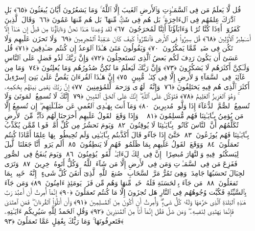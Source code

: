  قُل لَّا يَعلَمُ مَن فِى ٱلسَّمَـٰوَٟتِ وَٱلأَرضِ ٱلغَيبَ إِلَّا ٱللَّهُ ۚ وَمَا يَشعُرُونَ أَيَّانَ يُبعَثُونَ ﴿٦٥﴾
 بَلِ ٱدَّٰرَكَ عِلمُهُم فِى ٱلءَاخِرَةِ ۚ بَل هُم فِى شَكٍّۢ مِّنهَا ۖ بَل هُم مِّنهَا عَمُونَ ﴿٦٦﴾
 وَقَالَ ٱلَّذِينَ كَفَرُوٓا۟ أَءِذَا كُنَّا تُرَٰبًۭا وَءَابَآؤُنَآ أَئِنَّا لَمُخرَجُونَ ﴿٦٧﴾
 لَقَد وُعِدنَا هَـٰذَا نَحنُ وَءَابَآؤُنَا مِن قَبلُ إِن هَـٰذَآ إِلَّآ أَسَـٰطِيرُ ٱلأَوَّلِينَ ﴿٦٨﴾
 قُل سِيرُوا۟ فِى ٱلأَرضِ فَٱنظُرُوا۟ كَيفَ كَانَ عَـٰقِبَةُ ٱلمُجرِمِينَ ﴿٦٩﴾
 وَلَا تَحزَن عَلَيهِم وَلَا تَكُن فِى ضَيقٍۢ مِّمَّا يَمكُرُونَ ﴿٧٠﴾
 وَيَقُولُونَ مَتَىٰ هَـٰذَا ٱلوَعدُ إِن كُنتُم صَـٰدِقِينَ ﴿٧١﴾
 قُل عَسَىٰٓ أَن يَكُونَ رَدِفَ لَكُم بَعضُ ٱلَّذِى تَستَعجِلُونَ ﴿٧٢﴾
 وَإِنَّ رَبَّكَ لَذُو فَضلٍ عَلَى ٱلنَّاسِ وَلَـٰكِنَّ أَكثَرَهُم لَا يَشكُرُونَ ﴿٧٣﴾
 وَإِنَّ رَبَّكَ لَيَعلَمُ مَا تُكِنُّ صُدُورُهُم وَمَا يُعلِنُونَ ﴿٧٤﴾
 وَمَا مِن غَآئِبَةٍۢ فِى ٱلسَّمَآءِ وَٱلأَرضِ إِلَّا فِى كِتَـٰبٍۢ مُّبِينٍ ﴿٧٥﴾
 إِنَّ هَـٰذَا ٱلقُرءَانَ يَقُصُّ عَلَىٰ بَنِىٓ إِسرَٰٓءِيلَ أَكثَرَ ٱلَّذِى هُم فِيهِ يَختَلِفُونَ ﴿٧٦﴾
 وَإِنَّهُۥ لَهُدًۭى وَرَحمَةٌۭ لِّلمُؤمِنِينَ ﴿٧٧﴾
 إِنَّ رَبَّكَ يَقضِى بَينَهُم بِحُكمِهِۦ ۚ وَهُوَ ٱلعَزِيزُ ٱلعَلِيمُ ﴿٧٨﴾
 فَتَوَكَّل عَلَى ٱللَّهِ ۖ إِنَّكَ عَلَى ٱلحَقِّ ٱلمُبِينِ ﴿٧٩﴾
 إِنَّكَ لَا تُسمِعُ ٱلمَوتَىٰ وَلَا تُسمِعُ ٱلصُّمَّ ٱلدُّعَآءَ إِذَا وَلَّوا۟ مُدبِرِينَ ﴿٨٠﴾
 وَمَآ أَنتَ بِهَـٰدِى ٱلعُمىِ عَن ضَلَـٰلَتِهِم ۖ إِن تُسمِعُ إِلَّا مَن يُؤمِنُ بِـَٔايَـٰتِنَا فَهُم مُّسلِمُونَ ﴿٨١﴾
 ۞ وَإِذَا وَقَعَ ٱلقَولُ عَلَيهِم أَخرَجنَا لَهُم دَآبَّةًۭ مِّنَ ٱلأَرضِ تُكَلِّمُهُم أَنَّ ٱلنَّاسَ كَانُوا۟ بِـَٔايَـٰتِنَا لَا يُوقِنُونَ ﴿٨٢﴾
 وَيَومَ نَحشُرُ مِن كُلِّ أُمَّةٍۢ فَوجًۭا مِّمَّن يُكَذِّبُ بِـَٔايَـٰتِنَا فَهُم يُوزَعُونَ ﴿٨٣﴾
 حَتَّىٰٓ إِذَا جَآءُو قَالَ أَكَذَّبتُم بِـَٔايَـٰتِى وَلَم تُحِيطُوا۟ بِهَا عِلمًا أَمَّاذَا كُنتُم تَعمَلُونَ ﴿٨٤﴾
 وَوَقَعَ ٱلقَولُ عَلَيهِم بِمَا ظَلَمُوا۟ فَهُم لَا يَنطِقُونَ ﴿٨٥﴾
 أَلَم يَرَوا۟ أَنَّا جَعَلنَا ٱلَّيلَ لِيَسكُنُوا۟ فِيهِ وَٱلنَّهَارَ مُبصِرًا ۚ إِنَّ فِى ذَٟلِكَ لَءَايَـٰتٍۢ لِّقَومٍۢ يُؤمِنُونَ ﴿٨٦﴾
 وَيَومَ يُنفَخُ فِى ٱلصُّورِ فَفَزِعَ مَن فِى ٱلسَّمَـٰوَٟتِ وَمَن فِى ٱلأَرضِ إِلَّا مَن شَآءَ ٱللَّهُ ۚ وَكُلٌّ أَتَوهُ دَٟخِرِينَ ﴿٨٧﴾
 وَتَرَى ٱلجِبَالَ تَحسَبُهَا جَامِدَةًۭ وَهِىَ تَمُرُّ مَرَّ ٱلسَّحَابِ ۚ صُنعَ ٱللَّهِ ٱلَّذِىٓ أَتقَنَ كُلَّ شَىءٍ ۚ إِنَّهُۥ خَبِيرٌۢ بِمَا تَفعَلُونَ ﴿٨٨﴾
 مَن جَآءَ بِٱلحَسَنَةِ فَلَهُۥ خَيرٌۭ مِّنهَا وَهُم مِّن فَزَعٍۢ يَومَئِذٍ ءَامِنُونَ ﴿٨٩﴾
 وَمَن جَآءَ بِٱلسَّيِّئَةِ فَكُبَّت وُجُوهُهُم فِى ٱلنَّارِ هَل تُجزَونَ إِلَّا مَا كُنتُم تَعمَلُونَ ﴿٩٠﴾
 إِنَّمَآ أُمِرتُ أَن أَعبُدَ رَبَّ هَـٰذِهِ ٱلبَلدَةِ ٱلَّذِى حَرَّمَهَا وَلَهُۥ كُلُّ شَىءٍۢ ۖ وَأُمِرتُ أَن أَكُونَ مِنَ ٱلمُسلِمِينَ ﴿٩١﴾
 وَأَن أَتلُوَا۟ ٱلقُرءَانَ ۖ فَمَنِ ٱهتَدَىٰ فَإِنَّمَا يَهتَدِى لِنَفسِهِۦ ۖ وَمَن ضَلَّ فَقُل إِنَّمَآ أَنَا۠ مِنَ ٱلمُنذِرِينَ ﴿٩٢﴾
 وَقُلِ ٱلحَمدُ لِلَّهِ سَيُرِيكُم ءَايَـٰتِهِۦ فَتَعرِفُونَهَا ۚ وَمَا رَبُّكَ بِغَٰفِلٍ عَمَّا تَعمَلُونَ ﴿٩٣﴾
 
